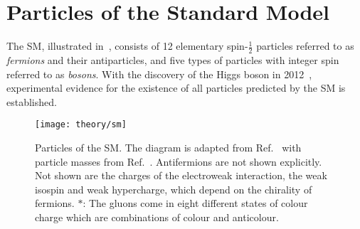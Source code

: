 \section{Particles of the Standard Model}%
\label{sec:sm_overview}

The SM, illustrated in~, consists of 12 elementary
spin-$\frac{1}{2}$ particles referred to as \emph{fermions} and their
antiparticles, and five types of particles with integer spin referred to as
\emph{bosons}. With the discovery of the Higgs boson in
2012~\cite{HIGG-2012-27,CMS-HIG-12-028}, experimental evidence for the existence
of all particles predicted by the SM is established.

\begin{figure}[htbp]
  \centering

  \texttt{[image: theory/sm]}

  \caption{Particles of the SM. The diagram is adapted from Ref.~\cite{sm_tikz}
    with particle masses from Ref.~\cite{pdg2020}. Antifermions are not shown
    explicitly.  Not shown are the charges of the electroweak interaction, the
    weak isospin and weak hypercharge, which depend on the chirality of
    fermions. $*$: The gluons come in eight different states of colour charge
    which are combinations of colour and anticolour.}%
  \label{fig:sm_particles}
\end{figure}

